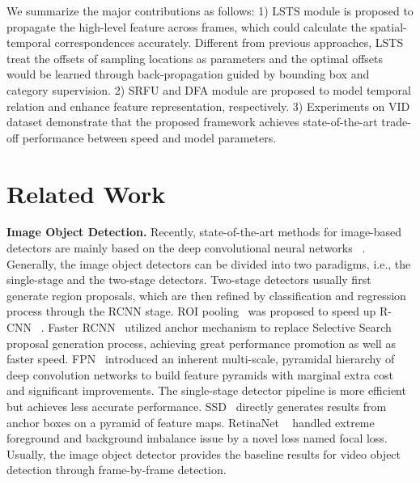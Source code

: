 \documentclass[runningheads]{llncs}
\begin{document}
We summarize the major contributions as follows: 1) LSTS module is proposed to propagate the high-level feature across frames, which could calculate the spatial-temporal correspondences accurately. Different from previous approaches, LSTS treat the offsets of sampling locations as parameters and the optimal offsets would be learned through back-propagation guided by bounding box and category supervision. 2) SRFU and DFA module are proposed to model temporal relation and enhance feature representation, respectively. 3) Experiments on VID dataset demonstrate that the proposed framework achieves state-of-the-art trade-off performance between speed and model parameters.



\section{Related Work}

\noindent \textbf{Image Object Detection.}
Recently, state-of-the-art methods for image-based detectors are mainly based on the deep convolutional neural networks ~\cite{ren2015faster,liu2016ssd,lin2017feature}. Generally, the image object detectors can be divided into two paradigms, i.e., the single-stage and the two-stage detectors. Two-stage detectors usually first generate region proposals, which are then refined by classification and regression process through the RCNN stage. ROI pooling~\cite{he2015spatial} was proposed to speed up R-CNN ~\cite{girshick2014rich}. Faster RCNN~\cite{ren2015faster} utilized anchor mechanism to replace Selective Search~\cite{uijlings2013selective} proposal generation process, achieving great performance promotion as well as faster speed. FPN~\cite{lin2017feature} introduced an inherent multi-scale, pyramidal hierarchy of deep convolution networks to build feature pyramids with marginal extra cost and significant improvements. The single-stage detector pipeline is more efficient but achieves less accurate performance. SSD~\cite{liu2016ssd} directly generates results from anchor boxes on a pyramid of feature maps. RetinaNet ~\cite{lin2017focal} handled extreme foreground and background imbalance issue by a novel loss named focal loss. Usually, the image object detector provides the baseline results for video object detection through frame-by-frame detection.
\end{document}
